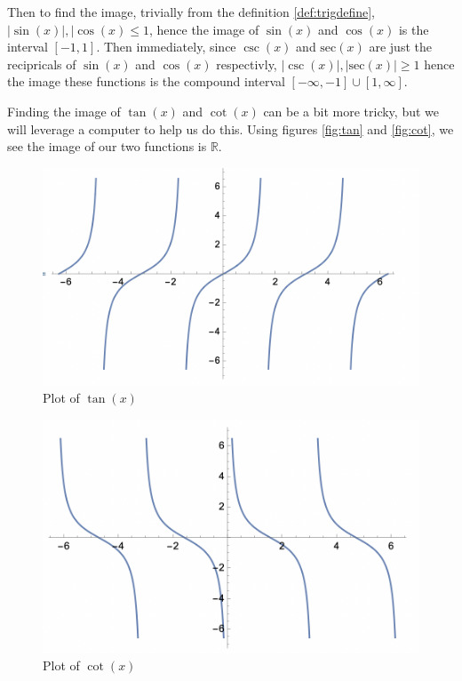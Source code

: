 \documentclass[11pt]{article}
\numberwithin{lemma}{section}
\numberwithin{equation}{section}
\numberwithin{define}{section}
\numberwithin{prop}{section}
\numberwithin{figure}{section}
\numberwithin{theorem}{section}
\numberwithin{cor}{section}
\newcounter{ex}[section]
\numberwithin{ex}{section}
\def\real{\mathbb{R}}
\begin{document}
Then to find the image, trivially from the definition \eqref{def:trigdefine}, $|\sin(x)|,|\cos(x)\le 1$, hence the image of $\sin(x)$ and $\cos(x)$ is the interval $[-1,1]$.
Then immediately, since $\csc(x)$ and $\text{sec}(x)$ are just the recipricals of $\sin(x)$ and $\cos(x)$ respectivly, $|\csc(x)|,|\text{sec}(x)|\ge 1$ hence the image these functions is the compound interval $[-\infty,-1]\cup[1,\infty]$.

Finding the image of $\tan(x)$ and $\cot(x)$ can be a bit more tricky, but we will leverage a computer to help us do this. Using figures \eqref{fig:tan} and \eqref{fig:cot}, we see the image of our two functions is $\real$.
\begin{figure}[h]
	\centering
	\includegraphics[scale=0.6]{Lesson5/tanplot.png}
	\caption{Plot of $\tan(x)$}
	\label{fig:tan}
\end{figure}
\begin{figure}[h]
	\centering
	\includegraphics[scale=0.6]{Lesson5/cotplot.png}
	\caption{Plot of $\cot(x)$}
	\label{fig:cot}
\end{figure}
\end{document}
